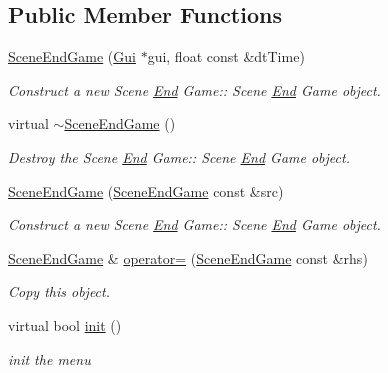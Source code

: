 \subsection*{Public Member Functions}
\begin{DoxyCompactItemize}
\item 
\hyperlink{class_scene_end_game_ae0c333662c69d5f3699f77c6d9539b3e}{Scene\+End\+Game} (\hyperlink{class_gui}{Gui} $\ast$gui, float const \&dt\+Time)
\begin{DoxyCompactList}\small\item\em Construct a new Scene \hyperlink{class_end}{End} Game\+:\+: Scene \hyperlink{class_end}{End} Game object. \end{DoxyCompactList}\item 
\mbox{\label{class_scene_end_game_a54e47de2f7d8fbc02fa67273d6aa8b5c}} 
virtual \hyperlink{class_scene_end_game_a54e47de2f7d8fbc02fa67273d6aa8b5c}{$\sim$\+Scene\+End\+Game} ()
\begin{DoxyCompactList}\small\item\em Destroy the Scene \hyperlink{class_end}{End} Game\+:\+: Scene \hyperlink{class_end}{End} Game object. \end{DoxyCompactList}\item 
\hyperlink{class_scene_end_game_a5dd61310665b7dd7d8c521aec22d596f}{Scene\+End\+Game} (\hyperlink{class_scene_end_game}{Scene\+End\+Game} const \&src)
\begin{DoxyCompactList}\small\item\em Construct a new Scene \hyperlink{class_end}{End} Game\+:\+: Scene \hyperlink{class_end}{End} Game object. \end{DoxyCompactList}\item 
\hyperlink{class_scene_end_game}{Scene\+End\+Game} \& \hyperlink{class_scene_end_game_a0b750f722b6820cf3cfe455b42c9a5d8}{operator=} (\hyperlink{class_scene_end_game}{Scene\+End\+Game} const \&rhs)
\begin{DoxyCompactList}\small\item\em Copy this object. \end{DoxyCompactList}\item 
virtual bool \hyperlink{class_scene_end_game_a9503a63d52d2a11dbc56c97f35ff6eae}{init} ()
\begin{DoxyCompactList}\small\item\em init the menu \end{DoxyCompactList}\item 

\end{DoxyCompactItemize}
